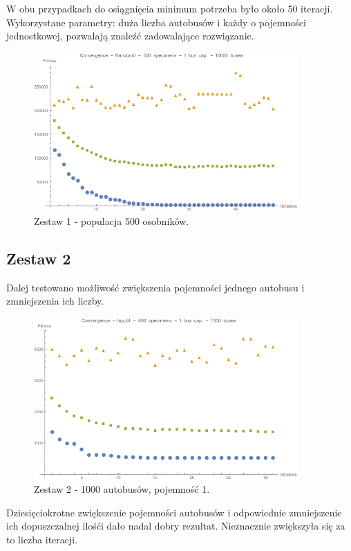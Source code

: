 \documentclass[polish,12pt]{aghthesis}
\begin{document}
W obu przypadkach do osiągnięcia minimum potrzeba było około 50 iteracji. Wykorzystane parametry: duża liczba autobusów i każdy o pojemności jednostkowej, pozwalają znaleźć zadowalające rozwiązanie.

\begin{figure}[!htbp]
	\centering
	\includegraphics[width=0.9\textwidth]{convRandom0Spec500Bc1Bus10000}
	\caption{Zestaw 1 - populacja 500 osobników.}
\end{figure}

\subsection{Zestaw 2}
Dalej testowano możliwość zwiększenia pojemności jednego autobusu i zmniejszenia ich liczby.

\begin{figure}[!htbp]
	\centering
	\includegraphics[width=0.9\textwidth]{convInput4Spec400Bc1Bus1000}
	\caption{Zestaw 2 - 1000 autobusów, pojemność 1.}
\end{figure}

Dziesięciokrotne zwiększenie pojemności autobusów i odpowiednie zmniejszenie ich dopuszczalnej ilośći dało nadal dobry rezultat. Nieznacznie zwiększyła się za to liczba iteracji.
\end{document}
